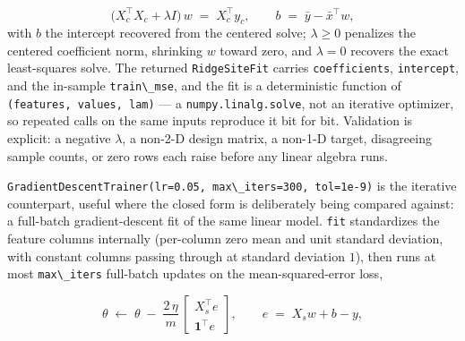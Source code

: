 \documentclass[
  10pt,
]{article}
\newcommand{\passthrough}[1]{#1}
\begin{document}
\begin{equation}
\label{eq:learn-ridge}
\bigl( X_c^{\!\top} X_c + \lambda I \bigr)\, w \;=\; X_c^{\!\top} y_c,
\qquad b \;=\; \bar{y} - \bar{x}^{\!\top} w,
\end{equation} with \(b\) the intercept recovered from the centered
solve; \(\lambda \geq 0\) penalizes the centered coefficient norm,
shrinking \(w\) toward zero, and \(\lambda = 0\) recovers the exact
least-squares solve. The returned \passthrough{\lstinline!RidgeSiteFit!}
carries \passthrough{\lstinline!coefficients!},
\passthrough{\lstinline!intercept!}, and the in-sample
\passthrough{\lstinline!train\_mse!}, and the fit is a deterministic
function of \passthrough{\lstinline!(features, values, lam)!} --- a
\passthrough{\lstinline!numpy.linalg.solve!}, not an iterative
optimizer, so repeated calls on the same inputs reproduce it bit for
bit. Validation is explicit: a negative \(\lambda\), a non-2-D design
matrix, a non-1-D target, disagreeing sample counts, or zero rows each
raise before any linear algebra runs.

\passthrough{\lstinline!GradientDescentTrainer(lr=0.05, max\_iters=300, tol=1e-9)!}
is the iterative counterpart, useful where the closed form is
deliberately being compared against: a full-batch gradient-descent fit
of the same linear model. \passthrough{\lstinline!fit!} standardizes the
feature columns internally (per-column zero mean and unit standard
deviation, with constant columns passing through at standard deviation
\(1\)), then runs at most \passthrough{\lstinline!max\_iters!}
full-batch updates on the mean-squared-error loss,

\begin{equation}
\label{eq:learn-gd}
\theta \;\leftarrow\; \theta \;-\; \frac{2\,\eta}{m}\,
\begin{bmatrix} X_s^{\!\top} e \\ \mathbf{1}^{\!\top} e \end{bmatrix},
\qquad e \;=\; X_s w + b - y,
\end{equation}
\end{document}
